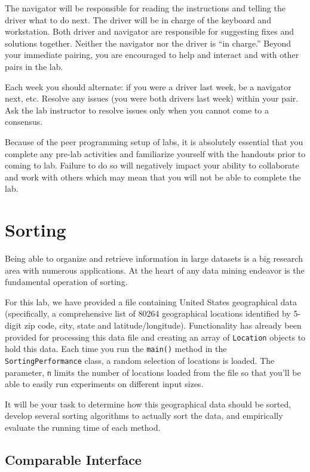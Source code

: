 \documentclass[12pt]{scrartcl}
\begin{document}
The navigator will be responsible for reading the instructions and
telling the driver what to do next.  The driver will be in charge of the
keyboard and workstation.  Both driver and navigator are responsible
for suggesting fixes and solutions together.  Neither the navigator
nor the driver is ``in charge.''  Beyond your immediate pairing, you
are encouraged to help and interact and with other pairs in the lab.

Each week you should alternate: if you were a driver last week, 
be a navigator next, etc.  Resolve any issues (you were both drivers
last week) within your pair.  Ask the lab instructor to resolve issues
only when you cannot come to a consensus.  

Because of the peer programming setup of labs, it is absolutely 
essential that you complete any pre-lab activities and familiarize
yourself with the handouts prior to coming to lab.  Failure to do
so will negatively impact your ability to collaborate and work with 
others which may mean that you will not be able to complete the
lab.  

\section*{Sorting}

Being able to organize and retrieve information in large datasets is 
a big research area with numerous applications.  At the heart of any 
data mining endeavor is the fundamental operation of sorting.

For this lab, we have provided a file containing United States 
geographical data (specifically, a comprehensive list of 80264 
geographical locations identified by 5-digit zip code, city, state 
and latitude/longitude).  Functionality has already been provided 
for processing this data file and creating an array of 
\texttt{Location} objects to hold this data.  Each time you 
run the \texttt{main()} method in the 
\texttt{SortingPerformance} class, a random selection of 
locations is loaded.  The parameter, \texttt{n} limits the 
number of locations loaded from the file so that you'll be able to 
easily run experiments on different input sizes.

It will be your task to determine how this geographical data should 
be sorted, develop several sorting algorithms to actually sort the 
data, and empirically evaluate the running time of each method.

\subsection*{Comparable Interface}
\end{document}
